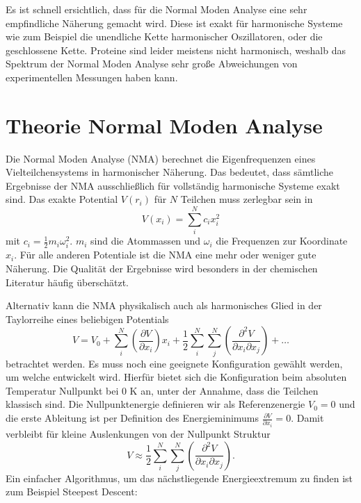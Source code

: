 \documentclass[a4paper,12pt]{article}
\begin{document}
Es ist schnell ersichtlich, dass für die Normal Moden Analyse eine sehr empfindliche Näherung gemacht wird. Diese ist exakt für harmonische Systeme
wie zum Beispiel die unendliche Kette harmonischer Oszillatoren, oder die geschlossene Kette. Proteine sind leider meistens nicht harmonisch, weshalb
das Spektrum der Normal Moden Analyse sehr große Abweichungen von experimentellen Messungen haben kann.



\section{Theorie Normal Moden Analyse}\label{nmasection}
Die Normal Moden Analyse (NMA) berechnet die Eigenfrequenzen eines Vielteilchensystems in harmonischer Näherung. Das bedeutet, dass sämtliche 
Ergebnisse der NMA ausschließlich für vollständig harmonische Systeme exakt sind. Das exakte Potential $V(r_i)$ für $N$ Teilchen muss zerlegbar 
sein in
\begin{equation}
 V(x_i)=\sum_i^N c_i x_i^2
\end{equation}
mit $c_i=\frac{1}{2}m_i \omega_i^2$. $m_i$ sind die Atommassen und $\omega_i$ die Frequenzen zur Koordinate $x_i$. Für alle anderen Potentiale ist 
die NMA eine mehr oder weniger gute Näherung. Die Qualität der Ergebnisse wird besonders in der chemischen Literatur häufig überschätzt.

Alternativ kann die NMA physikalisch auch als harmonisches Glied in der Taylorreihe eines beliebigen Potentials 
\begin{equation}
 V=V_0+\sum_i^N \left( \frac{\partial V}{\partial x_i} \right) x_i + \frac{1}{2} \sum_i^N \sum_j^N \left( \frac{\partial^2 V}{\partial x_i \partial x_j} \right) + \ldots
\end{equation}
betrachtet werden. Es muss noch eine geeignete Konfiguration gewählt werden, um welche entwickelt wird. Hierfür bietet sich die Konfiguration beim absoluten Temperatur Nullpunkt
bei 0 K an, unter der Annahme, dass die Teilchen klassisch sind. Die Nullpunktenergie definieren wir als Referenzenergie $V_0=0$ und die erste Ableitung ist per Definition 
des Energieminimums $\frac{\partial V}{\partial x_i}=0$. Damit verbleibt für kleine Auslenkungen von der Nullpunkt Struktur
\begin{equation}
 V\approx\frac{1}{2} \sum_i^N \sum_j^N \left( \frac{\partial^2 V}{\partial x_i \partial x_j} \right).
\end{equation}
Ein einfacher Algorithmus, um das nächstliegende Energieextremum zu finden ist zum Beispiel Steepest Descent:
\end{document}
